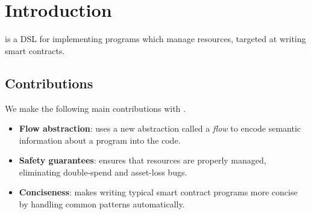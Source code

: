\documentclass[sigconf]{acmart}
\begin{document}

\maketitle

\section{Introduction}

\langName is a DSL for implementing programs which manage resources, targeted at writing smart contracts.

\subsection{Contributions}

We make the following main contributions with \langName.
\begin{itemize}
    \item \textbf{Flow abstraction}: \langName uses a new abstraction called a \emph{flow} to encode semantic information about a program into the code.

    \item \textbf{Safety guarantees}: \langName ensures that resources are properly managed, eliminating double-spend and asset-loss bugs.

    \item \textbf{Conciseness}: \langName makes writing typical smart contract programs more concise by handling common patterns automatically.


\end{itemize}
\end{document}
